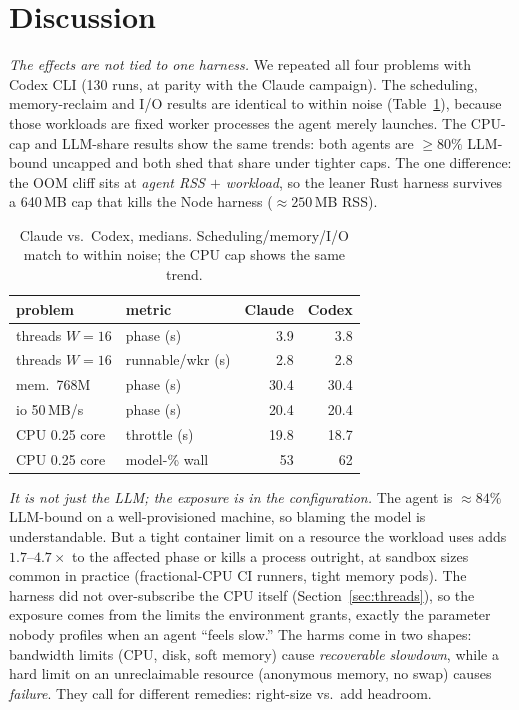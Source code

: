 \documentclass[10pt,conference]{IEEEtran}
\newcommand{\uu}[1]{\,\textsf{#1}}
\begin{document}
\section{Discussion}
\label{sec:consistency}

\emph{The effects are not tied to one harness.} We repeated all four
problems with Codex CLI (130 runs, at parity with the Claude campaign). The
scheduling, memory-reclaim and I/O results are identical to within noise
(Table~\ref{tab:consistency}), because those workloads are fixed worker
processes the agent merely launches. The CPU-cap and LLM-share results show
the same trends: both agents are ${\ge}80\%$ LLM-bound uncapped and both
shed that share under tighter caps. The one difference: the OOM cliff sits
at \emph{agent RSS $+$ workload}, so the leaner Rust harness survives a
640\,MB cap that kills the Node harness (${\approx}250$\,MB RSS).

\begin{table}[t]\centering\footnotesize
\setlength{\tabcolsep}{4pt}
\caption{Claude vs.\ Codex, medians. Scheduling/memory/I/O match to within
noise; the CPU cap shows the same trend.}
\label{tab:consistency}
\begin{tabular}{@{}llrr@{}}
\toprule
problem & metric & Claude & Codex\\
\midrule
threads $W{=}16$ & phase (s)        & 3.9 & 3.8 \\
threads $W{=}16$ & runnable/wkr (s) & 2.8 & 2.8 \\
mem.\ 768M       & phase (s)        & 30.4 & 30.4 \\
io 50\uu{MB/s}   & phase (s)        & 20.4 & 20.4 \\
CPU 0.25 core    & throttle (s)     & 19.8 & 18.7 \\
CPU 0.25 core    & model-\% wall    & 53 & 62 \\
\bottomrule
\end{tabular}
\end{table}

\emph{It is not just the LLM; the exposure is in the configuration.} The
agent is ${\approx}84\%$ LLM-bound on a well-provisioned machine, so blaming
the model is understandable. But a tight container limit on a resource the
workload uses adds $1.7$--$4.7\times$ to the affected phase or kills a
process outright, at sandbox sizes common in practice (fractional-CPU CI
runners, tight memory pods). The harness did not over-subscribe the CPU itself
(Section~\ref{sec:threads}), so the exposure comes from the limits the
environment grants, exactly the parameter nobody profiles when an agent
``feels slow.'' The harms come in two shapes: bandwidth limits (CPU,
disk, soft memory) cause \emph{recoverable slowdown}, while a hard limit on
an unreclaimable resource (anonymous memory, no swap) causes \emph{failure}.
They call for different remedies: right-size vs.\ add headroom.
\end{document}
